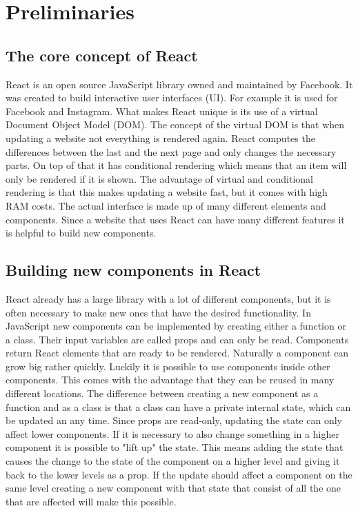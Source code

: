 \documentclass[11pt,a4paper]{article}
\begin{document}
\section{Preliminaries} \label{preliminaries}
\subsection{The core concept of React} 
React is an open source JavaScript library owned and maintained by Facebook.	It was created to build interactive user interfaces (UI). For example it is used for Facebook and Instagram. What makes React unique is its use of a virtual Document Object Model (DOM). The concept of the virtual DOM is that when updating a website not everything is rendered again. React computes the differences between the last and the next page and only changes the necessary parts. On top of that it has conditional rendering which means that an item will only be rendered if it is shown. The advantage of virtual and conditional rendering is that this makes updating a website fast, but it comes with high RAM costs. The actual interface is made up of many different elements and components. Since a website that uses React can have many different features it is helpful to build new components. 
\cite{reactjs}
	
	
\subsection{Building new components in React}
React already has a large library with a lot of different components, but it is often necessary to make new ones that have the desired functionality. In JavaScript new components can be implemented by creating either a function or a class. Their input variables are called props and can only be read. Components return React elements that are ready to be rendered. Naturally a component can grow big rather quickly. Luckily it is possible to use components inside other components. This comes with the advantage that they can be reused in many different locations. The difference between creating a new component as a function and as a class is that a class can have a private internal state, which can be updated an any time. Since props are read-only, updating the state can only affect lower components. If it is necessary to also change something in a higher component it is possible to "lift up" the state. This means adding the state that causes the change to the state of the component on a higher level and giving it back to the lower levels as a prop. If the update should affect a component on the same level creating a new component with that state that consist of all the one that are affected will  make this possible.
\cite{reactjsGS}
\end{document}
